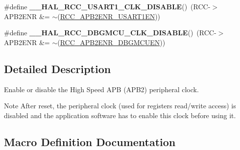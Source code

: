 \begin{DoxyCompactItemize}
\item 
\mbox{\label{group___r_c_c___a_p_b2___clock___enable___disable_gae0050944298552e9f02f56ec8634f5a6}} 
\#define {\bfseries \+\_\+\+\_\+\+H\+A\+L\+\_\+\+R\+C\+C\+\_\+\+U\+S\+A\+R\+T1\+\_\+\+C\+L\+K\+\_\+\+D\+I\+S\+A\+B\+LE}()~(R\+CC-\/$>$A\+P\+B2\+E\+NR \&= $\sim$(\hyperlink{group___peripheral___registers___bits___definition_ga4666bb90842e8134b32e6a34a0f165f3}{R\+C\+C\+\_\+\+A\+P\+B2\+E\+N\+R\+\_\+\+U\+S\+A\+R\+T1\+EN}))
\item 
\mbox{\label{group___r_c_c___a_p_b2___clock___enable___disable_gabe91adc2aacd167316a573d1101d50d2}} 
\#define {\bfseries \+\_\+\+\_\+\+H\+A\+L\+\_\+\+R\+C\+C\+\_\+\+D\+B\+G\+M\+C\+U\+\_\+\+C\+L\+K\+\_\+\+D\+I\+S\+A\+B\+LE}()~(R\+CC-\/$>$A\+P\+B2\+E\+NR \&= $\sim$(\hyperlink{group___peripheral___registers___bits___definition_ga87db727052e2e14b12cb728ba978ebb8}{R\+C\+C\+\_\+\+A\+P\+B2\+E\+N\+R\+\_\+\+D\+B\+G\+M\+C\+U\+EN}))
\end{DoxyCompactItemize}


\subsection{Detailed Description}
Enable or disable the High Speed A\+PB (A\+P\+B2) peripheral clock. 

\begin{DoxyNote}{Note}
After reset, the peripheral clock (used for registers read/write access) is disabled and the application software has to enable this clock before using it. 
\end{DoxyNote}


\subsection{Macro Definition Documentation}
\mbox{\label{group___r_c_c___a_p_b2___clock___enable___disable_gaa28c08d39ba2ec206a131f0861d7c1a1}} 
